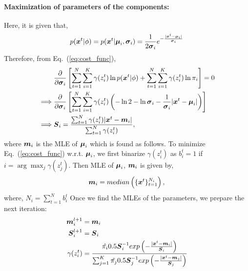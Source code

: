 \paragraph{Maximization of parameters of the components:} Here, it is given that,
\begin{equation}
	p(\boldsymbol{x}^t|\phi) = p(\boldsymbol{x}^t|\boldsymbol{\mu}_i, \boldsymbol{\sigma}_i) = \frac{1}{2\boldsymbol{\sigma}_i}e^{-\frac{|\boldsymbol{x}^t-\boldsymbol{\mu}_i|}{\boldsymbol{\sigma}_i}}
\end{equation}
Therefore, from Eq.~(\ref{eq:cost_func}),
\begin{equation}
	\begin{split}
		&\frac{\partial}{\partial \boldsymbol{\sigma}_i}\left[\sum_{t=1}^{N} \sum_{i=1}^{K} \gamma(z^t_i)\ln p(\boldsymbol{x}^t|\phi) + \sum_{t=1}^{N} \sum_{i=1}^{K} \gamma(z^t_i)\ln \pi_i\right] = 0\\
		\implies & \frac{\partial}{\partial \boldsymbol{\sigma}_i}\left[\sum_{t=1}^{N} \sum_{i=1}^{K} \gamma(z^t_i)\left(-\ln 2 - \ln \boldsymbol{\sigma}_i - \frac{1}{\boldsymbol{\sigma}_i}|\boldsymbol{x}^t-\boldsymbol{\mu}_i|\right)\right]\\
		\implies & \boldsymbol{S}_i = \frac{\sum_{t=1}^{N}\gamma(z^t_i)|\boldsymbol{x}^t-\boldsymbol{m}_i|}{\sum_{t=1}^{N}\gamma(z^t_i)},
	\end{split}
\end{equation}
where $\boldsymbol{m}_i$ is the MLE of $\boldsymbol{\mu}_i$ which is found as follows. To minimize Eq.~(\ref{eq:cost_func}) w.r.t. $\boldsymbol{\mu}_i$, we first binarize $\gamma(z^t_i)$ as $b^t_i=1$ if $i=\arg \max_{j}\gamma(z^t_j)$. Then MLE of $\boldsymbol{\mu}_i$, $\boldsymbol{m}_i$ is given by,
\begin{equation*}
	\boldsymbol{m}_i = median\left(\{\boldsymbol{x}^t\}^{N_i}_{t=1}\right),
\end{equation*}
where, $N_i=\sum_{t=1}^{N} b^t_i$
\newline
Once we find the MLEs of the parameters, we prepare the next iteration:
\begin{equation*}
	\begin{split}
		\boldsymbol{m}_{i}^{l+1} &= \boldsymbol{m}_i\\
		\boldsymbol{S}_i^{l+1} &= \boldsymbol{S}_i \\
		\gamma(z^t_i) &= \frac{\hat{\pi_i}0.5\boldsymbol{S}_i^{-1}exp\left(-\frac{|\boldsymbol{x}^t-\boldsymbol{m}_i|}{\boldsymbol{S}_i}\right)}{\sum_{j=1}^{K}\hat{\pi_j}0.5\boldsymbol{S}_j^{-1}exp\left(-\frac{|\boldsymbol{x}^t-\boldsymbol{m}_j|}{\boldsymbol{S}_j}\right)}
	\end{split}
\end{equation*}

